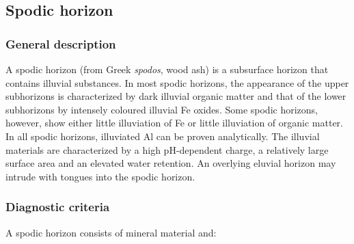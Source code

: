 \documentclass[
  letterpaper,
  DIV=11,
  numbers=noendperiod]{scrreprt}
\begin{document}
\hypertarget{spodic-horizon}{%
\subsection{Spodic horizon}\label{spodic-horizon}}

\hypertarget{general-description-34}{%
\subsubsection{General description}\label{general-description-34}}

A spodic horizon (from Greek \emph{spodos}, wood ash) is a subsurface
horizon that contains illuvial substances. In most spodic horizons, the
appearance of the upper subhorizons is characterized by dark illuvial
organic matter and that of the lower subhorizons by intensely coloured
illuvial Fe oxides. Some spodic horizons, however, show either little
illuviation of Fe or little illuviation of organic matter. In all spodic
horizons, illuviated Al can be proven analytically. The illuvial
materials are characterized by a high pH-dependent charge, a relatively
large surface area and an elevated water retention. An overlying eluvial
horizon may intrude with tongues into the spodic horizon.

\hypertarget{diagnostic-criteria-34}{%
\subsubsection{Diagnostic criteria}\label{diagnostic-criteria-34}}

A spodic horizon consists of mineral material and:
\end{document}
